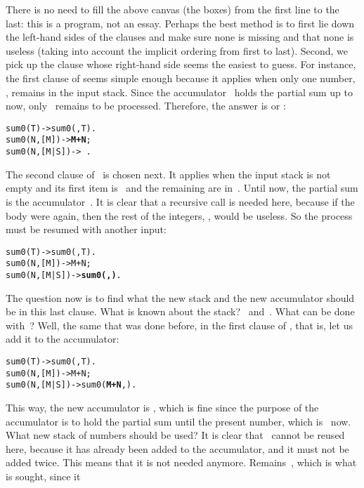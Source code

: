 There is no need to fill the above canvas (the boxes) from the first
line to the last: this is a program, not an essay. Perhaps the best
method is to first lie down the left\hyp{}hand sides of the clauses
and make sure none is missing and that none is useless (taking into
account the implicit ordering from first to last). Second, we pick up
the clause whose right\hyp{}hand side seems the easiest to guess. For
instance, the first clause of  seems simple enough
because it applies when only one number, , remains in the
input stack. Since the accumulator ~holds the partial sum
up to now, only~ remains to be processed. Therefore, the
answer is  or :
\begin{alltt}
sum0(T)       -> sum0(,T).
sum0(N,[M])   -> \textbf{M+N};
sum0(N,[M|S]) -> \,.
\end{alltt}
The second clause of~ is chosen next. It applies when
the input stack is not empty and its first item is~ and the
remaining are in~. Until now, the partial sum is the
accumulator~. It is clear that a recursive call is needed
here, because if the body were  again, then the rest of
the integers, , would be useless. So the process must be
resumed with another input:
\begin{alltt}
sum0(T)       -> sum0(,T).
sum0(N,[M])   -> M+N;
sum0(N,[M|S]) -> \textbf{sum0(}\textbf{,}\textbf{)}.
\end{alltt}
The question now is to find what the new stack and the new accumulator
should be in this last clause. What is known about the stack?
~and~. What can be done with~? Well,
the same that was done before, in the first clause of
, that is, let us add it to the accumulator:
\begin{alltt}
sum0(T)       -> sum0(,T).
sum0(N,[M])   -> M+N;
sum0(N,[M|S]) -> sum0(\textbf{M+N},).
\end{alltt}
This way, the new accumulator is , which is fine since
the purpose of the accumulator is to hold the partial sum until the
present number, which is~ now. What new stack of numbers
should be used? It is clear that~ cannot be reused here,
because it has already been added to the accumulator, and it must not
be added twice. This means that it is not needed
anymore. Remains~, which is what is sought, since it
